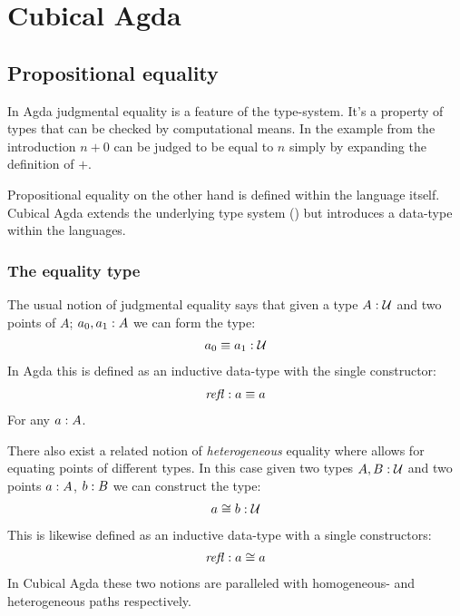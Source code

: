 \chapter{Cubical Agda}
\section{Propositional equality}
In Agda judgmental equality is a feature of the type-system. It's a property of
types that can be checked by computational means. In the example from the
introduction $n + 0$ can be judged to be equal to $n$ simply by expanding the
definition of $+$.

Propositional equality on the other hand is defined within the language itself.
Cubical Agda extends the underlying type system () but introduces a data-type within the
languages.

\subsection{The equality type}
The usual notion of judgmental equality says that given a type $A \mathrel{:} \mathcal{U}$ and
two points of $A$; $a_0, a_1 \mathrel{:} A$ we can form the type:
%
\begin{align}
  a_0 \equiv a_1 \mathrel{:} \mathcal{U}
\end{align}
%
In Agda this is defined as an inductive data-type with the single constructor:
%
\begin{align}
  \mathit{refl} \mathrel{:} a \equiv a
\end{align}
%
For any $a \mathrel{:} A$.

There also exist a related notion of \emph{heterogeneous} equality where allows
for equating points of different types. In this case given two types $A, B \mathrel{:}
\mathcal{U}$ and two points $a \mathrel{:} A$, $b \mathrel{:} B$ we can construct the type:
%
\begin{align}
  a \cong b \mathrel{:} \mathcal{U}
\end{align}
%
This is likewise defined as an inductive data-type with a single constructors:
%
\begin{align}
  \mathit{refl} \mathrel{:} a \cong a
\end{align}
%
In Cubical Agda these two notions are paralleled with homogeneous- and
heterogeneous paths respectively.
%
